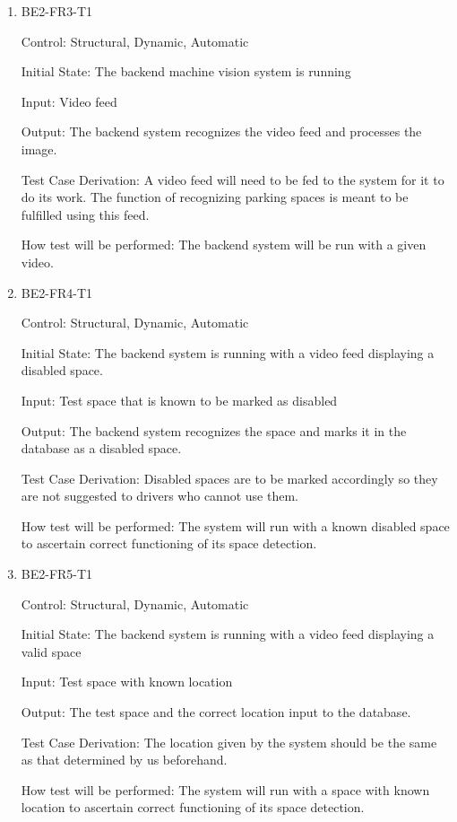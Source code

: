\documentclass[12pt, titlepage]{article}
\begin{document}
\begin{enumerate}

\item{BE2-FR3-T1}

Control: Structural, Dynamic, Automatic
					
Initial State: The backend machine vision system is running
					
Input: Video feed
					
Output: The backend system recognizes the video feed and processes the image.

Test Case Derivation: A video feed will need to be fed to the system for it to
do its work. The function of recognizing parking spaces is meant to be fulfilled
using this feed.
					
How test will be performed: The backend system will be run with a given video.

\item{BE2-FR4-T1}

Control: Structural, Dynamic, Automatic
					
Initial State: The backend system is running with a video feed displaying a
disabled space.
					
Input: Test space that is known to be marked as disabled
					
Output: The backend system recognizes the space and marks it in the database as
a disabled space.

Test Case Derivation: Disabled spaces are to be marked accordingly so they are
not suggested to drivers who cannot use them.
					
How test will be performed: The system will run with a known disabled space to
ascertain correct functioning of its space detection.

\item{BE2-FR5-T1}

Control: Structural, Dynamic, Automatic
					
Initial State: The backend system is running with a video feed displaying a
valid space
					
Input: Test space with known location
					
Output: The test space and the correct location input to the database.

Test Case Derivation: The location given by the system should be the same as
that determined by us beforehand.
					
How test will be performed: The system will run with a space with known location
to ascertain correct functioning of its space detection.


\end{enumerate}
\end{document}
